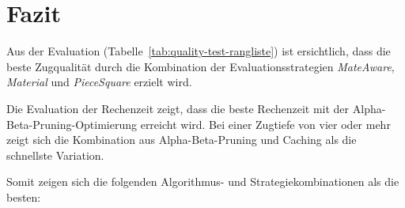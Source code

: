 \section{Fazit}
Aus der Evaluation (Tabelle~\ref{tab:quality-test-rangliste}) ist ersichtlich, dass die beste Zugqualität durch die Kombination der Evaluationsstrategien \textit{MateAware}, \textit{Material} und \textit{PieceSquare} erzielt wird.

Die Evaluation der Rechenzeit zeigt, dass die beste Rechenzeit mit der Alpha-Beta-Pruning-Optimierung erreicht wird.
Bei einer Zugtiefe von vier oder mehr zeigt sich die Kombination aus Alpha-Beta-Pruning und Caching als die schnellste Variation.

Somit zeigen sich die folgenden Algorithmus- und Strategiekombinationen als die besten:
\begin{table}[H]
    \centering
    \caption{Kombination für beste Zugqualität und kürzeste Rechenzeit}
    \label{tab:beste-zugqualitaet-und-kuerzeste-rechenzeit}
\end{table}